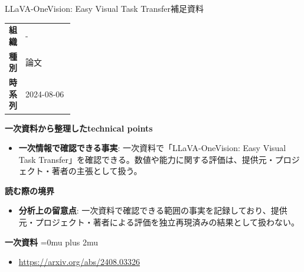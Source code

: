 \begin{technicalnote}{LLaVA-OneVision: Easy Visual Task Transfer}{補足資料}
\begingroup
\begin{tabularx}{\linewidth}{@{}>{\bfseries}p{0.22\linewidth}X@{}}
組織 & - \\
種別 & 論文 \\
時系列 & 2024-08-06 \\
\end{tabularx}
\smallskip
{\bfseries 一次資料から整理したtechnical points}
\begin{itemize}[leftmargin=1.5em,itemsep=0.35em]
\item \textbf{一次情報で確認できる事実}: 一次資料で「LLaVA-OneVision: Easy Visual Task Transfer」を確認できる。数値や能力に関する評価は、提供元・プロジェクト・著者の主張として扱う。
\end{itemize}
\begin{minipage}{\linewidth}
{\bfseries 読む際の境界}
\begin{itemize}[leftmargin=1.5em,itemsep=0.35em]
\item \textbf{分析上の留意点}: 一次資料で確認できる範囲の事実を記録しており、提供元・プロジェクト・著者による評価を独立再現済みの結果として扱わない。
\end{itemize}
\begin{samepage}
{\bfseries 一次資料}
\begingroup\sloppy
\Urlmuskip=0mu plus 2mu\relax
\begin{itemize}[leftmargin=1.5em,itemsep=0.25em]
\item {\scriptsize\url{https://arxiv.org/abs/2408.03326}}
\end{itemize}
\endgroup
\end{samepage}
\end{minipage}
\endgroup
\end{technicalnote}
\medskip

